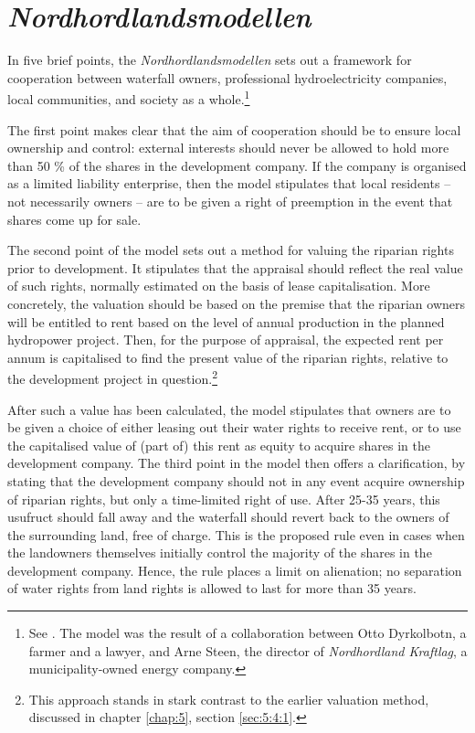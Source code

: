 \section{{\it Nordhordlandsmodellen}}\label{sec:4:5}

In five brief points, the {\it Nordhordlandsmodellen} sets out a framework for cooperation between waterfall owners, professional hydroelectricity companies, local communities, and society as a whole.\footnote{See \cite{dyrkolbotn96}. The model was the result of a collaboration between Otto Dyrkolbotn, a farmer and a lawyer, and Arne Steen, the director of {\it Nordhordland Kraftlag}, a municipality-owned energy company.} 

The first point makes clear that the aim of cooperation should be to ensure local ownership and control: external interests should never be allowed to hold more than 50 \% of the shares in the development company. If the company is organised as a limited liability enterprise, then the model stipulates that local residents -- not necessarily owners -- are to be given a right of preemption in the event that shares come up for sale. %

The second point of the model sets out a method for valuing the riparian rights prior to development. It stipulates that the appraisal should reflect the real value of such rights, normally estimated on the basis of lease capitalisation. More concretely, the valuation should be based on the premise that the riparian owners will be entitled to rent based on the level of annual production in the planned hydropower project. Then, for the purpose of appraisal, the expected rent per annum is capitalised to find the present value of the riparian rights, relative to the development project in question.\footnote{This approach stands in stark contrast to the earlier valuation method, discussed in chapter \ref{chap:5}, section \ref{sec:5:4:1}.}

After such a value has been calculated, the model stipulates that owners are to be given a choice of either leasing out their water rights to receive rent, or to use the capitalised value of (part of) this rent as equity to acquire shares in the development company. The third point in the model then offers a clarification, by stating that the development company should not in any event acquire ownership of riparian rights, but only a time-limited right of use. After 25-35 years, this usufruct should fall away and the waterfall should revert back to the owners of the surrounding land, free of charge. This is the proposed rule even in cases when the landowners themselves initially control the majority of the shares in the development company. Hence, the rule places a limit on alienation; no separation of water rights from land rights is allowed to last for more than 35 years. 

